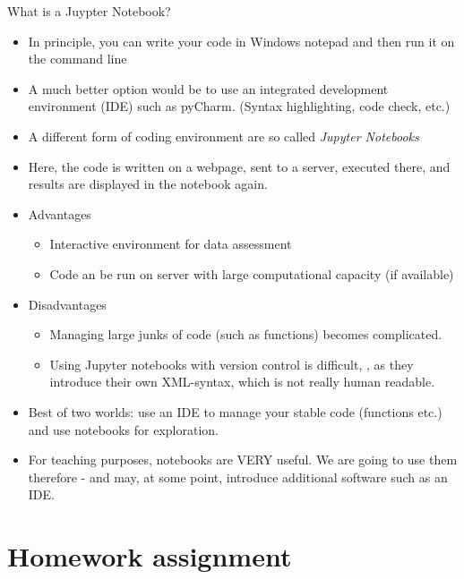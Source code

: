 \begin{frame}{What is a Juypter Notebook?}
	
	\begin{itemize}
		\item In principle, you can write your code in Windows notepad and then run it on the command line
		\item A much better option would be to use an integrated development environment (IDE) such as pyCharm. (Syntax highlighting, code check, etc.)
		\item A different form of coding environment are so called \textit{Jupyter Notebooks}
		\item Here, the code is written on a webpage, sent to a server, executed there, and results are displayed in the notebook again.
		\item Advantages
			\begin{itemize}
				\item Interactive environment for data assessment
				\item Code an be run on server with large computational capacity (if available)
			\end{itemize}
		\item Disadvantages
			\begin{itemize}
				\item Managing large junks of code (such as functions) becomes complicated. 
				\item Using Jupyter notebooks with version control is difficult, , as they introduce their own XML-syntax, which is not really human readable. 
				
			\end{itemize}
		\item Best of two worlds: use an IDE to manage your stable code (functions etc.) and use notebooks for exploration.
		\item For teaching purposes, notebooks are VERY useful. We are going to use them therefore - and may, at some point, introduce additional software such as an IDE.
	\end{itemize}	
	
	
\end{frame}


\section{Homework assignment}

